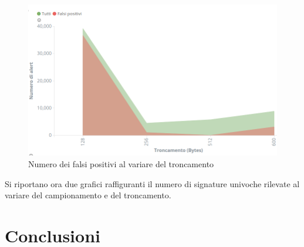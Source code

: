 \documentclass[12pt,a4paper,openright,twoside]{report}
\renewcommand{\chaptermark}[1]{\markboth{\thechapter.\ #1}{}}
\begin{document}
\begin{figure}[h!]
\begin{center}                          %
  \includegraphics[width=\textwidth]{images/DARPA-falsipositivi.png}
  \caption{Numero dei falsi positivi al variare del troncamento}
  \label{}
\end{center}
\end{figure}

Si riportano ora due grafici raffiguranti il numero di signature univoche rilevate
al variare del campionamento e del troncamento.

\clearpage{\pagestyle{empty}\cleardoublepage}
\chapter*{Conclusioni}
\renewcommand{\chaptermark}[1]{\markright{\thechapter \ #1}{}}
\lhead[\fancyplain{}{\bfseries\thepage}]{\fancyplain{}{\bfseries\rightmark}}
\appendix                               %
\end{document}
